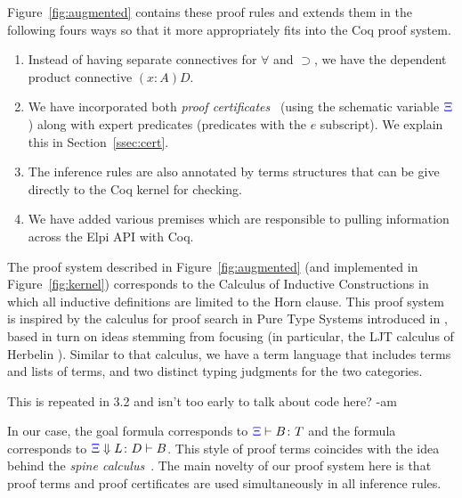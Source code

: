 Figure~\ref{fig:augmented} contains these proof rules and extends them
in the following fours ways so that it more appropriately fits into
the Coq proof system.
\begin{enumerate}
  \item Instead of having separate connectives for $\forall$ and
    $\supset$, we have the dependent product connective $(x:A)D$. 
  \item We have incorporated both \emph{proof certificates}~\cite{chihani17jar} (using the
    schematic variable ${\color{blue}{\Xi}}$) along with expert predicates
    (predicates with the $e$ subscript). We explain this in Section~\ref{ssec:cert}.
  \item The inference rules are also annotated by terms structures that
    can be give directly to the Coq kernel for checking.
  \item We have added various premises which are responsible to
    pulling information across the Elpi API with Coq.
\end{enumerate}
The proof system described in Figure~\ref{fig:augmented} (and
implemented in Figure~\ref{fig:kernel}) corresponds to the Calculus
of Inductive Constructions in which all inductive definitions are
limited to the Horn clause.
%
This proof system is inspired by the calculus for proof search in
Pure Type Systems introduced in \cite{LengrandDM06}, based in turn on
ideas stemming from focusing (in particular, the LJT calculus of
Herbelin \cite{Herbelin94}). Similar to that calculus, we have a
term language that includes terms and lists of terms, and two distinct
typing judgments for the two categories.
\begin{metanote}
  This is repeated in 3.2 and isn't too early to talk about code here? -am
\end{metanote}
%
In our case, the \lP goal formula 
corresponds to ${\color{blue}{\Xi}}\vdash B \colon T$ and the formula
%
 corresponds to ${\color{blue}{\Xi}}\Downarrow L\colon
D\vdash B$.
%
This style of  proof terms coincides with the idea behind the \emph{spine
  calculus}~\cite{Cervesato97tr}.  The main novelty of our proof
system here is that proof terms and proof certificates are used
simultaneously in all inference rules.

